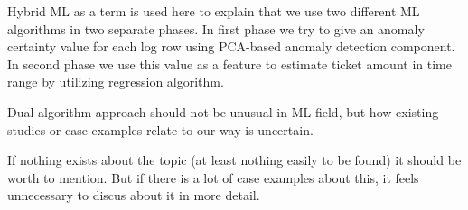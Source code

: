 \begin{itcomment}
    Hybrid ML as a term is used here to explain that we
    use two different ML algorithms in two separate phases.
    In first phase we try to give an anomaly certainty value for each log row
    using PCA-based anomaly detection component.
    In second phase we use this value as a feature to estimate ticket amount in time range
    by utilizing regression algorithm.

    Dual algorithm approach should not be unusual in ML field,
    but how existing studies or case examples relate to our way is uncertain.

    If nothing exists about the topic (at least nothing easily to be found)
    it should be worth to mention.
    But if there is a lot of case examples about this, it feels unnecessary
    to discus about it in more detail.
\end{itcomment}


\clearpage
